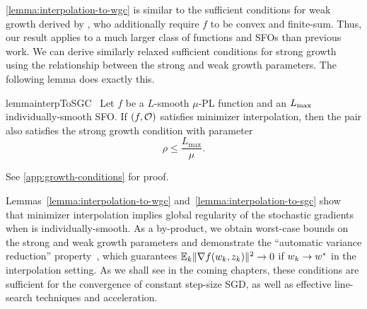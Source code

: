 \autoref{lemma:interpolation-to-wgc} is similar to the sufficient conditions for weak growth derived by \citet{vaswani2019fast}, who additionally require \( f \) to be convex and finite-sum. 
Thus, our result applies to a much larger class of functions and \acp{SFO} than previous work.
We can derive similarly relaxed sufficient conditions for strong growth using the relationship between the strong and weak growth parameters. 
The following lemma does exactly this.

\begin{restatable}{lemma}{interpToSGC}~\label{lemma:interpolation-to-sgc}
    Let \( f \) be a \( L \)-smooth  \( \mu \)-\ac{PL} function and \oracle{} an \( \Lmax \) individually-smooth \ac{SFO}.
    If \( \rbr{f, \oracle{}} \) satisfies minimizer interpolation, then the pair also satisfies the strong growth condition with parameter
    \[ \rho \leq \frac{L_{\text{max}}}{\mu}. \]
\end{restatable}
\noindent See \autoref{app:growth-conditions} for proof. \hfill \break

Lemmas~\ref{lemma:interpolation-to-wgc} and~\ref{lemma:interpolation-to-sgc} show that minimizer interpolation implies global regularity of the stochastic gradients when \oracle{} is individually-smooth. 
As a by-product, we obtain worst-case bounds on the strong and weak growth parameters and demonstrate the ``automatic variance reduction'' property~\citep{liu2020accelerating}, which guarantees \( \E_k\norm{\grad(\wk, \zk)}^2 \rightarrow 0 \) if \( \wk \rightarrow \wopt \) in the interpolation setting.
As we shall see in the coming chapters, these conditions are sufficient for the convergence of constant step-size \ac{SGD}, as well as effective line-search techniques and acceleration. 

